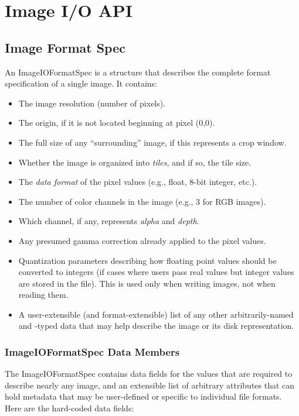 \chapter{Image I/O API}
\label{chap:imageioapi}


\section{Image Format Spec}

An {\kw ImageIOFormatSpec} is a structure that describes the complete
format specification of a single image.  It contains:

\begin{itemize}
\item The image resolution (number of pixels).
\item The origin, if it is not located beginning at pixel (0,0).
\item The full size of any ``surrounding'' image, if this represents a crop
  window.
\item Whether the image is organized into \emph{tiles}, and if so, the
  tile size.
\item The \emph{data format} of the pixel values (e.g., float, 8-bit
  integer, etc.).
\item The number of color channels in the image (e.g., 3 for RGB
  images).
\item Which channel, if any, represents \emph{alpha} and \emph{depth}.
\item Any presumed gamma correction already applied to the pixel values.
\item Quantization parameters describing how floating point values
  should be converted to integers (if cases where users pass real values
  but integer values are stored in the file).  This is used only when
  writing images, not when reading them.
\item A user-extensible (and format-extensible) list of any other
  arbitrarily-named and -typed data that may help describe the image or
  its disk representation.
\end{itemize}

\subsection{{\kw ImageIOFormatSpec} Data Members}

The {\kw ImageIOFormatSpec} contains data fields for the values that are
required to describe nearly any image, and an extensible list of
arbitrary attributes that can hold metadata that may be user-defined or
specific to individual file formats.  Here are the hard-coded data
fields:

